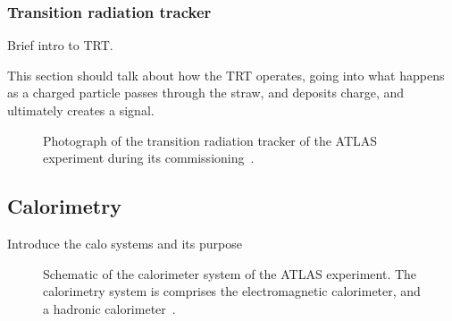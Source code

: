 \FloatBarrier
\subsubsection{Transition radiation tracker} 

{\color{red} Brief intro to TRT. }

{\color{red}This section should talk about how the TRT operates, going into
  what happens as a charged particle passes through the straw, and deposits
  charge, and ultimately creates a signal.
}


\begin{figure}[ht]
  \caption{
    Photograph of the transition radiation tracker of the ATLAS
    experiment during its commissioning~\cite{Maximilien:889555}.
  }
  \label{fig:trt_module}
\end{figure}

\FloatBarrier
\subsection{Calorimetry} 

{\color{red} Introduce the calo systems and its purpose}

\begin{figure}[ht]
  \caption[
    Schematic of the calorimeter system of the ATLAS
    experiment~\cite{cern-jinst-atlas}.
  ]{
    Schematic of the calorimeter system of the ATLAS
    experiment.
    The calorimetry system is comprises the electromagnetic calorimeter,
    and a hadronic calorimeter~\cite{cern-jinst-atlas}.
  }
  \label{fig:calo_cartoon}
\end{figure}


